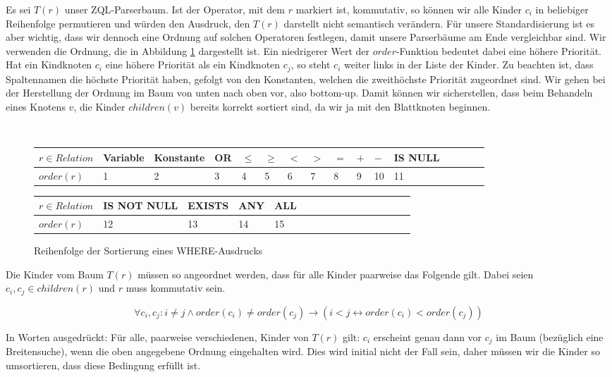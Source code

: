 Es sei $T(r)$ unser ZQL-Parserbaum. Ist der Operator, mit dem $r$ markiert ist, kommutativ, so können wir alle Kinder $c_i$ in beliebiger Reihenfolge permutieren und würden den Ausdruck, den $T(r)$ darstellt nicht semantisch verändern. Für unsere Standardisierung ist es aber wichtig, dass wir dennoch eine Ordnung auf solchen Operatoren festlegen, damit unsere Parserbäume am Ende vergleichbar sind. Wir verwenden die Ordnung, die in Abbildung \ref{fig:sortorder} dargestellt ist. Ein niedrigerer Wert der $\mathit{order}$-Funktion bedeutet dabei eine höhere Priorität. Hat ein Kindknoten $c_i$ eine höhere Priorität als ein Kindknoten $c_j$, so steht $c_i$ weiter links in der Liste der Kinder. Zu beachten ist, dass Spaltennamen die höchste Priorität haben, gefolgt von den Konstanten, welchen die zweithöchste Priorität zugeordnet sind. Wir gehen bei der Herstellung der Ordnung im Baum von unten nach oben vor, also bottom-up. Damit können wir sicherstellen, dass beim Behandeln eines Knotens $v$, die Kinder $children(v)$ bereits korrekt sortiert sind, da wir ja mit den Blattknoten beginnen.

\begin{figure}[H]\
\begin{tabular}{|l|l|l|l|l|l|l|l|l|l|l|l|l|l|l|l|}
\hline
$r\in \textit{Relation}$ & Variable & Konstante & OR & $\le$ & $\ge$ & $<$ & $>$ & $=$& $+$ & $-$  & IS NULL\\\hline
$\textit{order}(r)$ & 1 & 2 & 3 & 4 & 5 & 6 & 7 & 8 & 9 & 10 & 11\\ 
\hline
\end{tabular}\newline
\begin{tabular}{|l|l|l|l|l|l|l|l|l|l|l|l|l|l|l|l|}
\hline
$r\in \textit{Relation}$ & IS NOT NULL & EXISTS & ANY & ALL  \\\hline
$\textit{order}(r)$ & 12 & 13 & 14 & 15 \\ 
\hline
\end{tabular}
\caption{Reihenfolge der Sortierung eines WHERE-Ausdrucks}
\label{fig:sortorder}
\end{figure}

Die Kinder vom Baum $T(r)$ müssen so angeordnet werden, dass für alle Kinder paarweise das Folgende gilt. Dabei seien $c_i,c_j\in\mathit{children}(r)$ und $r$ muss kommutativ sein.

$$\forall c_i,c_j : i\neq j \wedge order(c_i) \neq order(c_j) \to  ( i<j \leftrightarrow order(c_i) < order(c_j) ) $$

In Worten ausgedrückt: Für alle, paarweise verschiedenen, Kinder von $T(r)$ gilt: $c_i$ erscheint genau dann vor $c_j$ im Baum (bezüglich eine Breitensuche), wenn die oben angegebene Ordnung eingehalten wird. Dies wird initial nicht der Fall sein, daher müssen wir die Kinder so umsortieren, dass diese Bedingung erfüllt ist. 

